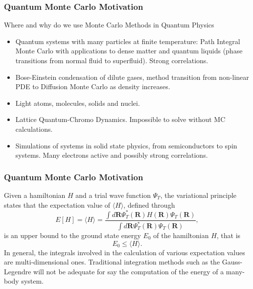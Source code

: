 \documentclass{beamer}
\begin{document}
\begin{frame}
\frametitle{Quantum Monte Carlo Motivation}

\begin{block}{Where and why do we use Monte Carlo Methods in Quantum Physics }
\begin{itemize}
\item Quantum systems with many particles at finite temperature: Path Integral Monte Carlo with applications to dense matter and quantum liquids (phase transitions from normal fluid to superfluid). Strong correlations.

\item Bose-Einstein condensation of dilute gases, method transition from  non-linear PDE to Diffusion Monte Carlo as density increases.

\item Light atoms, molecules, solids and nuclei. 

\item Lattice Quantum-Chromo Dynamics. Impossible to solve without MC calculations. 

\item Simulations of systems in solid state physics, from semiconductors to spin systems. Many electrons active and possibly strong correlations.
\end{itemize}

\noindent
\end{block}
\end{frame}

\begin{frame}
\frametitle{Quantum Monte Carlo Motivation}

\begin{block}{}
Given a hamiltonian $H$ and a trial wave function $\Psi_T$, the variational principle states that the expectation value of $\langle H \rangle$, defined through 
\[
   E[H]= \langle H \rangle =
   \frac{\int d\bm{R}\Psi^{\ast}_T(\bm{R})H(\bm{R})\Psi_T(\bm{R})}
        {\int d\bm{R}\Psi^{\ast}_T(\bm{R})\Psi_T(\bm{R})},
\]
is an upper bound to the ground state energy $E_0$ of the hamiltonian $H$, that is 
\[
    E_0 \le \langle H \rangle .
\]
In general, the integrals involved in the calculation of various  expectation values  are multi-dimensional ones. Traditional integration methods such as the Gauss-Legendre will not be adequate for say the  computation of the energy of a many-body system.
\end{block}
\end{frame}
\end{document}
